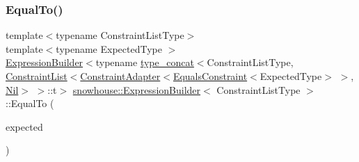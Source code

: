 \mbox{\label{structsnowhouse_1_1ExpressionBuilder_a90421497f5a1b73564f76eee13289003}} 
\subsubsection{\texorpdfstring{EqualTo()}{EqualTo()}\hspace{0.1cm}{\footnotesize\ttfamily [1/2]}}
{\footnotesize\ttfamily template$<$typename Constraint\+List\+Type$>$ \\
template$<$typename Expected\+Type $>$ \\
\mbox{\hyperlink{structsnowhouse_1_1ExpressionBuilder}{Expression\+Builder}}$<$typename \mbox{\hyperlink{structsnowhouse_1_1type__concat}{type\+\_\+concat}}$<$Constraint\+List\+Type, \mbox{\hyperlink{structsnowhouse_1_1ConstraintList}{Constraint\+List}}$<$\mbox{\hyperlink{structsnowhouse_1_1ConstraintAdapter}{Constraint\+Adapter}}$<$\mbox{\hyperlink{structsnowhouse_1_1EqualsConstraint}{Equals\+Constraint}}$<$Expected\+Type$>$ $>$, \mbox{\hyperlink{structsnowhouse_1_1Nil}{Nil}}$>$ $>$\+::t$>$ \mbox{\hyperlink{structsnowhouse_1_1ExpressionBuilder}{snowhouse\+::\+Expression\+Builder}}$<$ Constraint\+List\+Type $>$\+::Equal\+To (\begin{DoxyParamCaption}\item[{const Expected\+Type \&}]{expected }\end{DoxyParamCaption})\hspace{0.3cm}{\ttfamily [inline]}}

\mbox{\label{structsnowhouse_1_1ExpressionBuilder_af4bface30b14ef54c89f50dcd9bc38c5}} 
